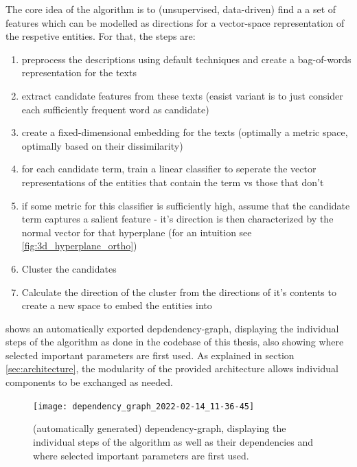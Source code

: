 The core idea of the algorithm is to (unsupervised, data-driven) find a a set of features which can be modelled as directions for a vector-space representation of the respetive entities. For that, the steps are:

\begin{enumerate}
	\item preprocess the descriptions using default techniques and create a bag-of-words representation for the texts
	\item extract candidate features from these texts (easist variant is to just consider each sufficiently frequent word as candidate)
	\item create a fixed-dimensional embedding for the texts (optimally a metric space, optimally based on their dissimilarity)
	\item for each candidate term, train a linear classifier to seperate the vector representations of the entities that contain the term vs those that don't
	\item if some metric for this classifier is sufficiently high, assume that the candidate term captures a salient feature - it's direction is then characterized by the normal vector for that hyperplane (for an intuition see \ref{fig:3d_hyperplane_ortho})
	\item Cluster the candidates
	\item Calculate the direction of the cluster from the directions of it's contents to create a new space to embed the entities into
\end{enumerate}


 shows an automatically exported depdendency-graph, displaying the individual steps of the algorithm as done in the codebase of this thesis, also showing where selected important parameters are first used. As explained in section \ref{sec:architecture}, the modularity of the provided architecture allows individual components to be exchanged as needed.


\begin{figure}[htp]
	\begin{center}
	  \texttt{[image: dependency\_graph\_2022-02-14\_11-36-45]}
	  \caption[Dependency-Graph of the Algorithm]{(automatically generated) dependency-graph, displaying the individual steps of the algorithm as well as their dependencies and where selected important parameters are first used.}
	  \label{fig:depdendency_graph}
	\end{center}
\end{figure}


